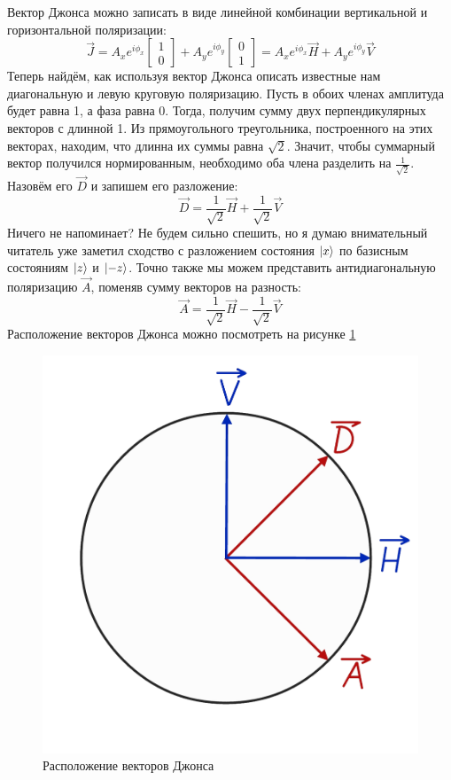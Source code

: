 Вектор Джонса можно записать в виде линейной комбинации вертикальной и горизонтальной поляризации:
\[
\Vec{J} = A_x e^{i\phi_x}\begin{bmatrix} 1 \\ 0 \end{bmatrix} + A_y e^{i\phi_y}\begin{bmatrix} 0 \\ 1 \end{bmatrix} = A_x e^{i\phi_x}\Vec{H} + A_y e^{i\phi_y}\Vec{V}
\]
Теперь найдём, как используя вектор Джонса описать известные нам диагональную и левую круговую поляризацию. Пусть в обоих членах амплитуда будет равна 1, а фаза равна 0. Тогда, получим сумму двух перпендикулярных векторов с длинной 1. Из прямоугольного треугольника, построенного на этих векторах, находим, что длинна их суммы равна $\sqrt{2}$. Значит, чтобы суммарный вектор получился нормированным, необходимо оба члена разделить на $\frac{1}{\sqrt{2}}$. Назовём его $\Vec{D}$ и запишем его разложение:
\[
\Vec{D} = \frac{1}{\sqrt{2}}\Vec{H} + \frac{1}{\sqrt{2}}\Vec{V}
\]
Ничего не напоминает? Не будем сильно спешить, но я думаю внимательный читатель уже заметил сходство с разложением состояния $\ket{x}$ по базисным состояниям $\ket{z}$ и $\ket{-z}$. Точно также мы можем представить антидиагональную поляризацию $\Vec{A}$, поменяв сумму векторов на разность:
\[
\Vec{A} = \frac{1}{\sqrt{2}}\Vec{H} - \frac{1}{\sqrt{2}}\Vec{V}
\]
Расположение векторов Джонса можно посмотреть на рисунке \ref{fig B.5}
\begin{figure}[!ht]
\centering
\includegraphics[scale=0.23]{appendix/images/pol phys space.png}
\caption{Расположение векторов Джонса}
\label{fig B.5}
\end{figure}


